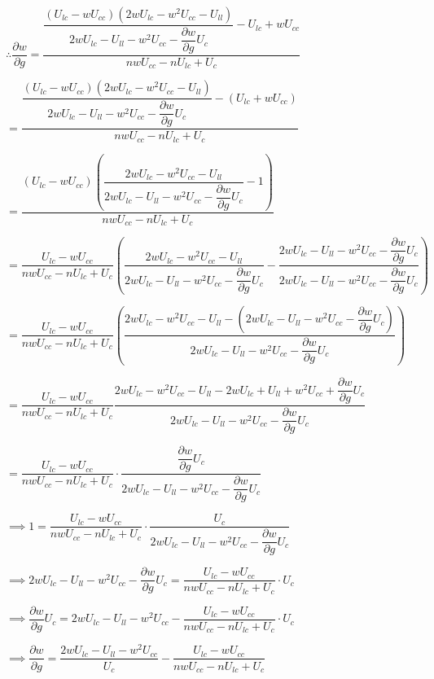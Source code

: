 \documentclass{article}
\begin{document}
$\therefore \dfrac{\partial w}{\partial g}=\dfrac{\dfrac{\left(U_{lc}-wU_{cc}\right)\left(2wU_{lc}-w^2U_{cc}-U_{ll}\right)}{2wU_{lc}-U_{ll}-w^{2}U_{cc}-\dfrac{\partial w}{\partial g}U_{c}}-U_{lc}+wU_{cc}}{nwU_{cc}-nU_{lc}+U_{c}}$

$=\dfrac{\dfrac{\left(U_{lc}-wU_{cc}\right)\left(2wU_{lc}-w^2U_{cc}-U_{ll}\right)}{2wU_{lc}-U_{ll}-w^{2}U_{cc}-\dfrac{\partial w}{\partial g}U_{c}}-\left(U_{lc}+wU_{cc}\right)}{nwU_{cc}-nU_{lc}+U_{c}}$

$=\dfrac{\left(U_{lc}-wU_{cc}\right)\left(\dfrac{2wU_{lc}-w^2U_{cc}-U_{ll}}{2wU_{lc}-U_{ll}-w^{2}U_{cc}-\dfrac{\partial w}{\partial g}U_{c}}-1\right)}{nwU_{cc}-nU_{lc}+U_{c}}$

$=\dfrac{U_{lc}-wU_{cc}}{nwU_{cc}-nU_{lc}+U_{c}}\left(\dfrac{2wU_{lc}-w^2U_{cc}-U_{ll}}{2wU_{lc}-U_{ll}-w^{2}U_{cc}-\dfrac{\partial w}{\partial g}U_{c}}-\dfrac{2wU_{lc}-U_{ll}-w^{2}U_{cc}-\dfrac{\partial w}{\partial g}U_{c}}{2wU_{lc}-U_{ll}-w^{2}U_{cc}-\dfrac{\partial w}{\partial g}U_{c}}\right)$

$=\dfrac{U_{lc}-wU_{cc}}{nwU_{cc}-nU_{lc}+U_{c}}\left(\dfrac{2wU_{lc}-w^2U_{cc}-U_{ll}-\left(2wU_{lc}-U_{ll}-w^{2}U_{cc}-\dfrac{\partial w}{\partial g}U_{c}\right)}{2wU_{lc}-U_{ll}-w^{2}U_{cc}-\dfrac{\partial w}{\partial g}U_{c}}\right)$

$=\dfrac{U_{lc}-wU_{cc}}{nwU_{cc}-nU_{lc}+U_{c}}\dfrac{2wU_{lc}-w^2U_{cc}-U_{ll}-2wU_{lc}+U_{ll}+w^{2}U_{cc}+\dfrac{\partial w}{\partial g}U_{c}}{2wU_{lc}-U_{ll}-w^{2}U_{cc}-\dfrac{\partial w}{\partial g}U_{c}}$

$=\dfrac{U_{lc}-wU_{cc}}{nwU_{cc}-nU_{lc}+U_{c}}\cdot\dfrac{\dfrac{\partial w}{\partial g}U_{c}}{2wU_{lc}-U_{ll}-w^{2}U_{cc}-\dfrac{\partial w}{\partial g}U_{c}}$

$\implies 1=\dfrac{U_{lc}-wU_{cc}}{nwU_{cc}-nU_{lc}+U_{c}}\cdot\dfrac{U_{c}}{2wU_{lc}-U_{ll}-w^{2}U_{cc}-\dfrac{\partial w}{\partial g}U_{c}}$

$\implies 2wU_{lc}-U_{ll}-w^{2}U_{cc}-\dfrac{\partial w}{\partial g}U_{c}=\dfrac{U_{lc}-wU_{cc}}{nwU_{cc}-nU_{lc}+U_{c}}\cdot U_{c}$

$\implies \dfrac{\partial w}{\partial g}U_{c}=2wU_{lc}-U_{ll}-w^{2}U_{cc}-\dfrac{U_{lc}-wU_{cc}}{nwU_{cc}-nU_{lc}+U_{c}}\cdot U_{c}$

$\implies \dfrac{\partial w}{\partial g}=\dfrac{2wU_{lc}-U_{ll}-w^{2}U_{cc}}{U_{c}}-\dfrac{U_{lc}-wU_{cc}}{nwU_{cc}-nU_{lc}+U_{c}}$
\end{document}
